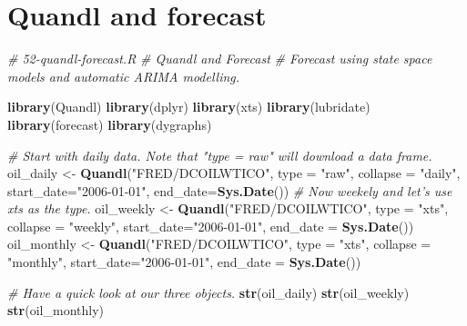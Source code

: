 \documentclass[]{article}
\newenvironment{Shaded}{\begin{snugshade}}{\end{snugshade}}
\newcommand{\CommentTok}[1]{\textcolor[rgb]{0.56,0.35,0.01}{\textit{#1}}}
\newcommand{\DataTypeTok}[1]{\textcolor[rgb]{0.13,0.29,0.53}{#1}}
\newcommand{\KeywordTok}[1]{\textcolor[rgb]{0.13,0.29,0.53}{\textbf{#1}}}
\newcommand{\NormalTok}[1]{#1}
\newcommand{\StringTok}[1]{\textcolor[rgb]{0.31,0.60,0.02}{#1}}
\begin{document}
\hypertarget{quandl-and-forecast}{%
\section{Quandl and forecast}\label{quandl-and-forecast}}

\begin{Shaded}
\begin{Highlighting}[]
\CommentTok{# 52-quandl-forecast.R}
\CommentTok{# Quandl and Forecast}
\CommentTok{# Forecast using state space models and automatic ARIMA modelling.}

\KeywordTok{library}\NormalTok{(Quandl)}
\KeywordTok{library}\NormalTok{(dplyr)}
\KeywordTok{library}\NormalTok{(xts)}
\KeywordTok{library}\NormalTok{(lubridate)}
\KeywordTok{library}\NormalTok{(forecast)}
\KeywordTok{library}\NormalTok{(dygraphs)}

\CommentTok{# Start with daily data. Note that "type = raw" will download a data frame.}
\NormalTok{oil_daily <-}\StringTok{ }\KeywordTok{Quandl}\NormalTok{(}\StringTok{"FRED/DCOILWTICO"}\NormalTok{, }\DataTypeTok{type =} \StringTok{"raw"}\NormalTok{, }\DataTypeTok{collapse =} \StringTok{"daily"}\NormalTok{,  }
                    \DataTypeTok{start_date=}\StringTok{"2006-01-01"}\NormalTok{, }\DataTypeTok{end_date=}\KeywordTok{Sys.Date}\NormalTok{())}
\CommentTok{# Now weekely and let's use xts as the type.}
\NormalTok{oil_weekly <-}\StringTok{ }\KeywordTok{Quandl}\NormalTok{(}\StringTok{"FRED/DCOILWTICO"}\NormalTok{, }\DataTypeTok{type =} \StringTok{"xts"}\NormalTok{, }\DataTypeTok{collapse =} \StringTok{"weekly"}\NormalTok{,}
                     \DataTypeTok{start_date=}\StringTok{"2006-01-01"}\NormalTok{, }\DataTypeTok{end_date =} \KeywordTok{Sys.Date}\NormalTok{())}
\NormalTok{oil_monthly <-}\StringTok{ }\KeywordTok{Quandl}\NormalTok{(}\StringTok{"FRED/DCOILWTICO"}\NormalTok{, }\DataTypeTok{type =} \StringTok{"xts"}\NormalTok{, }\DataTypeTok{collapse =} \StringTok{"monthly"}\NormalTok{,}
                      \DataTypeTok{start_date=}\StringTok{"2006-01-01"}\NormalTok{, }\DataTypeTok{end_date =} \KeywordTok{Sys.Date}\NormalTok{())}

\CommentTok{# Have a quick look at our three  objects. }
\KeywordTok{str}\NormalTok{(oil_daily)}
\KeywordTok{str}\NormalTok{(oil_weekly)}
\KeywordTok{str}\NormalTok{(oil_monthly)}


\end{Highlighting}
\end{Shaded}
\end{document}
